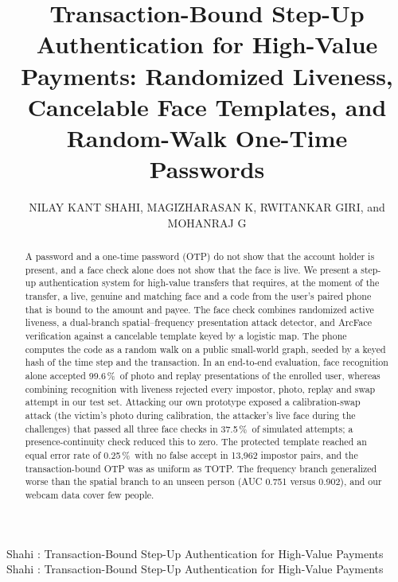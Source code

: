 \documentclass{ieeeaccess}
\newcommand{\pct}{\,\%}
\begin{document}

\title{Transaction-Bound Step-Up Authentication for High-Value Payments: Randomized Liveness,
Cancelable Face Templates, and Random-Walk One-Time Passwords}

\author{\uppercase{Nilay Kant Shahi},
\uppercase{Magizharasan K},
\uppercase{Rwitankar Giri}, and
\uppercase{Mohanraj G}}

\address[1]{School of Computer Science Engineering and Information Systems, Vellore Institute of
Technology, Vellore, Tamil Nadu 632014, India}  %


\markboth
{Shahi \headeretal: Transaction-Bound Step-Up Authentication for High-Value Payments}
{Shahi \headeretal: Transaction-Bound Step-Up Authentication for High-Value Payments}


\begin{abstract}
A password and a one-time password (OTP) do not show that the account holder is present, and a face
check alone does not show that the face is live. We
present a step-up authentication system for high-value transfers that requires, at the moment of the
transfer, a live, genuine and matching face and a code from the user's paired phone that is bound to
the amount and payee. The face check combines randomized active liveness, a dual-branch
spatial--frequency presentation attack detector, and ArcFace verification against a cancelable template
keyed by a logistic map. The phone computes the code as a random walk on a public small-world graph,
seeded by a keyed hash of the time step and the transaction. In an end-to-end evaluation, face
recognition alone accepted 99.6\pct\ of photo and replay presentations of the enrolled user, whereas
combining recognition with liveness rejected every impostor, photo, replay and swap attempt in our test
set. Attacking our own prototype exposed a calibration-swap attack (the victim's photo during
calibration, the attacker's live face during the challenges) that passed all three face checks in
37.5\pct\ of simulated attempts; a presence-continuity check reduced this to zero. The
protected template reached an equal error rate of 0.25\pct\ with no false accept in 13,962 impostor
pairs, and the transaction-bound OTP was as uniform as TOTP. The frequency branch generalized worse than
the spatial branch to an unseen person (AUC 0.751 versus 0.902), and our webcam data cover few people.
\end{abstract}
\end{document}
